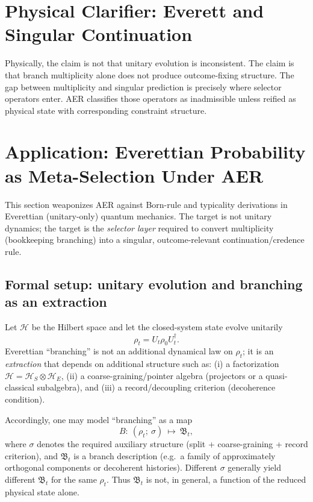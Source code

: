 \documentclass[11pt]{article}
\theoremstyle{remark}
\theoremstyle{plain}
\begin{document}

\section{Physical Clarifier: Everett and Singular Continuation}

Physically, the claim is not that unitary evolution is inconsistent.
The claim is that branch multiplicity alone does not produce outcome-fixing structure.
The gap between multiplicity and singular prediction is precisely where selector
operators enter. AER classifies those operators as inadmissible unless reified
as physical state with corresponding constraint structure.

\section{Application: Everettian Probability as Meta-Selection Under AER}
\label{sec:everett}

This section weaponizes AER against Born-rule and typicality derivations in Everettian (unitary-only) quantum mechanics.
The target is not unitary dynamics; the target is the \emph{selector layer} required to convert multiplicity
(bookkeeping branching) into a singular, outcome-relevant continuation/credence rule.

\subsection{Formal setup: unitary evolution and branching as an extraction}

Let $\mathcal{H}$ be the Hilbert space and let the closed-system state evolve unitarily
\begin{equation}
\rho_t = U_t \rho_0 U_t^\dagger.
\end{equation}
Everettian ``branching'' is not an additional dynamical law on $\rho_t$; it is an \emph{extraction}
that depends on additional structure such as:
(i) a factorization $\mathcal{H}=\mathcal{H}_S\otimes \mathcal{H}_E$,
(ii) a coarse-graining/pointer algebra (projectors or a quasi-classical subalgebra),
and (iii) a record/decoupling criterion (decoherence condition).

Accordingly, one may model ``branching'' as a map
\begin{equation}
B:\ (\rho_t;\ \sigma)\ \mapsto\ \mathfrak{B}_t,
\end{equation}
where $\sigma$ denotes the required auxiliary structure (split + coarse-graining + record criterion),
and $\mathfrak{B}_t$ is a branch description (e.g.\ a family of approximately orthogonal components
or decoherent histories). Different $\sigma$ generally yield different $\mathfrak{B}_t$ for the same $\rho_t$.
Thus $\mathfrak{B}_t$ is not, in general, a function of the reduced physical state alone.
\end{document}
